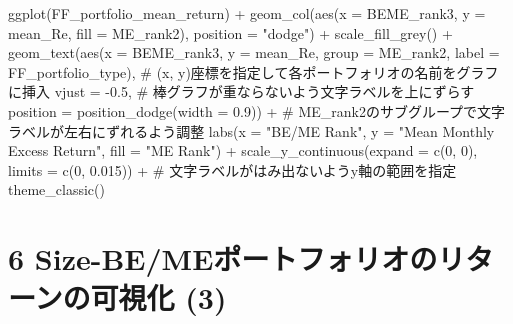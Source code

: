 \documentclass[
  letterpaper,
  DIV=11,
  numbers=noendperiod]{scrreprt}
\newenvironment{Shaded}{\begin{snugshade}}{\end{snugshade}}
\newcommand{\AttributeTok}[1]{\textcolor[rgb]{0.40,0.45,0.13}{#1}}
\newcommand{\CommentTok}[1]{\textcolor[rgb]{0.37,0.37,0.37}{#1}}
\newcommand{\DecValTok}[1]{\textcolor[rgb]{0.68,0.00,0.00}{#1}}
\newcommand{\FloatTok}[1]{\textcolor[rgb]{0.68,0.00,0.00}{#1}}
\newcommand{\FunctionTok}[1]{\textcolor[rgb]{0.28,0.35,0.67}{#1}}
\newcommand{\NormalTok}[1]{\textcolor[rgb]{0.00,0.23,0.31}{#1}}
\newcommand{\SpecialCharTok}[1]{\textcolor[rgb]{0.37,0.37,0.37}{#1}}
\newcommand{\StringTok}[1]{\textcolor[rgb]{0.13,0.47,0.30}{#1}}
\begin{document}
\begin{Shaded}
\begin{Highlighting}[]
\FunctionTok{ggplot}\NormalTok{(FF\_portfolio\_mean\_return) }\SpecialCharTok{+} 
  \FunctionTok{geom\_col}\NormalTok{(}\FunctionTok{aes}\NormalTok{(}\AttributeTok{x =}\NormalTok{ BEME\_rank3, }\AttributeTok{y =}\NormalTok{ mean\_Re, }\AttributeTok{fill =}\NormalTok{ ME\_rank2), }\AttributeTok{position =} \StringTok{"dodge"}\NormalTok{) }\SpecialCharTok{+} 
  \FunctionTok{scale\_fill\_grey}\NormalTok{() }\SpecialCharTok{+}
  \FunctionTok{geom\_text}\NormalTok{(}\FunctionTok{aes}\NormalTok{(}\AttributeTok{x =}\NormalTok{ BEME\_rank3, }\AttributeTok{y =}\NormalTok{ mean\_Re, }\AttributeTok{group =}\NormalTok{ ME\_rank2, }\AttributeTok{label =}\NormalTok{ FF\_portfolio\_type), }\CommentTok{\# (x, y)座標を指定して各ポートフォリオの名前をグラフに挿入}
            \AttributeTok{vjust =} \SpecialCharTok{{-}}\FloatTok{0.5}\NormalTok{, }\CommentTok{\# 棒グラフが重ならないよう文字ラベルを上にずらす}
            \AttributeTok{position =} \FunctionTok{position\_dodge}\NormalTok{(}\AttributeTok{width =} \FloatTok{0.9}\NormalTok{)) }\SpecialCharTok{+} \CommentTok{\# ME\_rank2のサブグループで文字ラベルが左右にずれるよう調整}
  \FunctionTok{labs}\NormalTok{(}\AttributeTok{x =} \StringTok{"BE/ME Rank"}\NormalTok{, }\AttributeTok{y =} \StringTok{"Mean Monthly Excess Return"}\NormalTok{, }\AttributeTok{fill =} \StringTok{"ME Rank"}\NormalTok{) }\SpecialCharTok{+} 
  \FunctionTok{scale\_y\_continuous}\NormalTok{(}\AttributeTok{expand =} \FunctionTok{c}\NormalTok{(}\DecValTok{0}\NormalTok{, }\DecValTok{0}\NormalTok{), }\AttributeTok{limits =} \FunctionTok{c}\NormalTok{(}\DecValTok{0}\NormalTok{, }\FloatTok{0.015}\NormalTok{)) }\SpecialCharTok{+} \CommentTok{\# 文字ラベルがはみ出ないようy軸の範囲を指定}
  \FunctionTok{theme\_classic}\NormalTok{()}
\end{Highlighting}
\end{Shaded}

\section{6 Size-BE/MEポートフォリオのリターンの可視化
(3)}\label{size-bemeux30ddux30fcux30c8ux30d5ux30a9ux30eaux30aaux306eux30eaux30bfux30fcux30f3ux306eux53efux8996ux5316-3}
\end{document}
